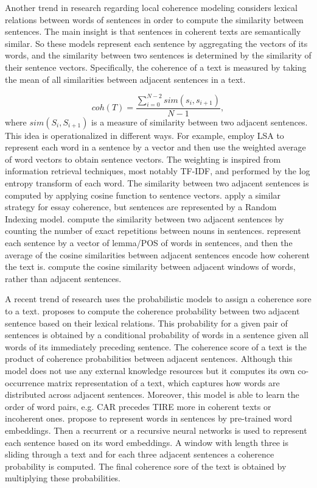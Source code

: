 Another trend in research regarding local coherence modeling considers lexical relations between words of sentences in order to compute the similarity between sentences.    
The main insight is that sentences in coherent texts are semantically similar. 
So these models represent each sentence by aggregating the vectors of its words, and the similarity between two sentences is determined by the similarity of their sentence vectors. 
Specifically, the coherence of a text is measured by taking the mean of all similarities between adjacent sentences in a text. 

\begin{equation}
coh(T) = \frac{\sum_{i=0}^{N-2}sim(s_i,s_{i+1})}{N-1},
\end{equation} 
%
where $sim(S_i, S_{i+1})$ is a measure of similarity between two adjacent sentences. 
This idea is operationalized in different ways.
For example,  employ LSA to represent each word in a sentence by a vector and then use the weighted average of word vectors to obtain sentence vectors. 
The weighting is inspired from information retrieval techniques, most notably TF-IDF, and performed by the log entropy transform of each word. 
The similarity between two adjacent sentences is computed by applying cosine function to sentence vectors. 
 apply a similar strategy for essay coherence, but sentences are represented by a Random Indexing model. 
 compute the similarity between two adjacent sentences by counting the number of exact repetitions between nouns in sentences. 
 represent each sentence by a vector of lemma/POS of words in sentences, and then the average of the cosine similarities between adjacent sentences encode how coherent the text is. 
 compute the cosine similarity between adjacent windows of words, rather than adjacent sentences. 

A recent trend of research uses the probabilistic models to assign a coherence sore to a text. 
 proposes to compute the coherence probability between two adjacent sentence based on their lexical relations. 
This probability for a given pair of sentences is obtained by a conditional probability of words in a sentence given all words of its immediately preceding sentence. 
The coherence score of a text is the product of coherence probabilities between adjacent sentences. 
Although this model does not use any external knowledge resources but it computes its own co-occurrence matrix representation of a  text, which captures how words are distributed across adjacent sentences. 
Moreover, this model is able to learn the order of word pairs, e.g. CAR precedes TIRE more in coherent texts or incoherent ones.  
 propose to represent words in sentences by pre-trained word embeddings. 
Then a recurrent or a recursive neural networks is used to represent each sentence based on its word embeddings. 
A window with length three is sliding through a text and for each three adjacent sentences a coherence probability is computed. 
The final coherence sore of the text is obtained by multiplying these probabilities. 

